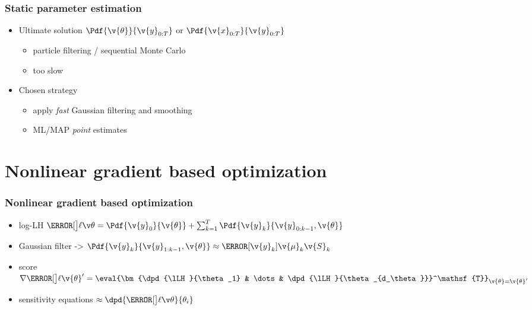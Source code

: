 \documentclass[t,professionalfont,10pt]{beamer}
\newcommand{\yk}{\v{y}_{k}}
\newcommand{\y}{\v{y}}
\newcommand{\x}{\v{x}}
\newcommand{\X}{\x_{0:T}}
\newcommand{\Y}{\y_{0:T}}
\newcommand{\tr}{\mathsf{T}}
\newcommand{\Th}{\v{\theta}}
\begin{document}
\begin{frame}
	\frametitle{Static parameter estimation}
\begin{itemize}
  \item Ultimate solution $\Pdf{\Th}{\Y}$ or $\Pdf{\X}{\Y}$
  \begin{itemize}
    \item particle filtering / sequential Monte Carlo
    \item too slow
  \end{itemize}
  \item Chosen strategy
  \begin{itemize}
    \item apply \emph{fast} Gaussian filtering and smoothing
    \item ML/MAP \emph{point} estimates 
    \end{itemize}
\end{itemize}

\end{frame}	


\section{Nonlinear gradient based optimization}

\begin{frame}
	\frametitle{Nonlinear gradient based optimization}
	\begin{itemize}
	  \item log-LH $\lLH=\Pdf{\y_0}{\Th}+\sum_{k=1}^T \Pdf{\y_k}{\y_{0:k-1},\Th}$
	  \item Gaussian filter -> $\Pdf{\y_k}{\y_{1:k-1},\Th} \approx \N[\yk]{\v{\mu}_k}{\v{S}_k}$
	  \item score $\score[\Th']=\eval{\bm{\dpd{\lLH}{\theta_1} & \dots & \dpd{\lLH}{\theta_{d_\theta}}}^\tr}_{\Th=\Th'}$
	  \item sensitivity equations $\approx \dpd{\lLH}{\theta_i}$
	\end{itemize}
\end{frame}
\end{document}
